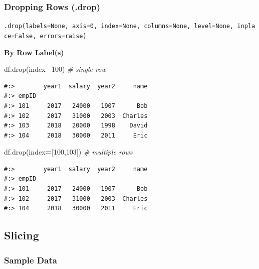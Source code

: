 \documentclass[
]{book}
\newenvironment{Shaded}{\begin{snugshade}}{\end{snugshade}}
\newcommand{\CommentTok}[1]{\textcolor[rgb]{0.37,0.37,0.37}{\textit{#1}}}
\newcommand{\DecValTok}[1]{\textcolor[rgb]{0.06,0.06,0.06}{#1}}
\newcommand{\NormalTok}[1]{#1}
\newcommand{\OperatorTok}[1]{\textcolor[rgb]{0.43,0.43,0.43}{\textbf{#1}}}
\begin{document}
\hypertarget{dropping-rows-.drop}{%
\subsubsection{Dropping Rows (.drop)}\label{dropping-rows-.drop}}

\texttt{.drop(labels=None,\ axis=0,\ index=None,\ columns=None,\ level=None,\ inplace=False,\ errors=\textquotesingle{}raise\textquotesingle{})}

\textbf{By Row Label(s)}

\begin{Shaded}
\begin{Highlighting}[]
\NormalTok{df.drop(index}\OperatorTok{=}\DecValTok{100}\NormalTok{)       }\CommentTok{# single row}
\end{Highlighting}
\end{Shaded}

\begin{verbatim}
#:>        year1  salary  year2     name
#:> empID                               
#:> 101     2017   24000   1907      Bob
#:> 102     2017   31000   2003  Charles
#:> 103     2018   20000   1998    David
#:> 104     2018   30000   2011     Eric
\end{verbatim}

\begin{Shaded}
\begin{Highlighting}[]
\NormalTok{df.drop(index}\OperatorTok{=}\NormalTok{[}\DecValTok{100}\NormalTok{,}\DecValTok{103}\NormalTok{])   }\CommentTok{# multiple rows}
\end{Highlighting}
\end{Shaded}

\begin{verbatim}
#:>        year1  salary  year2     name
#:> empID                               
#:> 101     2017   24000   1907      Bob
#:> 102     2017   31000   2003  Charles
#:> 104     2018   30000   2011     Eric
\end{verbatim}

\hypertarget{slicing}{%
\subsection{Slicing}\label{slicing}}

\hypertarget{sample-data-10}{%
\subsubsection{Sample Data}\label{sample-data-10}}
\end{document}
